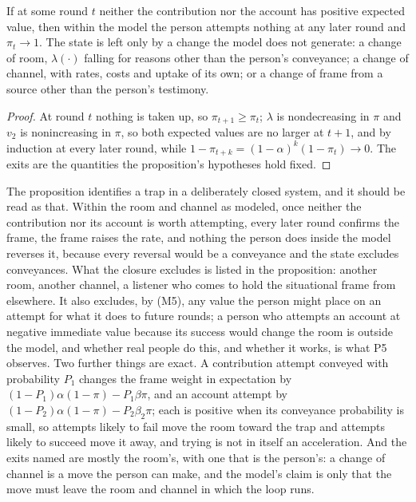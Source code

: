 \begin{proposition}\label{prop:absorbing}
If at some round $t$ neither the contribution nor the account has positive expected value, then within the model the person attempts nothing at any later round and $\pi_t \to 1$. The state is left only by a change the model does not generate: a change of room, $\lambda(\cdot)$ falling for reasons other than the person's conveyance; a change of channel, with rates, costs and uptake of its own; or a change of frame from a source other than the person's testimony.
\end{proposition}

\begin{proof}
At round $t$ nothing is taken up, so $\pi_{t+1} \ge \pi_t$; $\lambda$ is nondecreasing in $\pi$ and $v_2$ is nonincreasing in $\pi$, so both expected values are no larger at $t+1$, and by induction at every later round, while $1 - \pi_{t+k} = (1-\alpha)^k(1-\pi_t) \to 0$. The exits are the quantities the proposition's hypotheses hold fixed.
\end{proof}

The proposition identifies a trap in a deliberately closed system, and it should be read as that. Within the room and channel as modeled, once neither the contribution nor its account is worth attempting, every later round confirms the frame, the frame raises the rate, and nothing the person does inside the model reverses it, because every reversal would be a conveyance and the state excludes conveyances. What the closure excludes is listed in the proposition: another room, another channel, a listener who comes to hold the situational frame from elsewhere. It also excludes, by (M5), any value the person might place on an attempt for what it does to future rounds; a person who attempts an account at negative immediate value because its success would change the room is outside the model, and whether real people do this, and whether it works, is what P5 observes. Two further things are exact. A contribution attempt conveyed with probability $P_1$ changes the frame weight in expectation by $(1-P_1)\alpha(1-\pi) - P_1\beta\pi$, and an account attempt by $(1-P_2)\alpha(1-\pi) - P_2\beta_2\pi$; each is positive when its conveyance probability is small, so attempts likely to fail move the room toward the trap and attempts likely to succeed move it away, and trying is not in itself an acceleration. And the exits named are mostly the room's, with one that is the person's: a change of channel is a move the person can make, and the model's claim is only that the move must leave the room and channel in which the loop runs.


